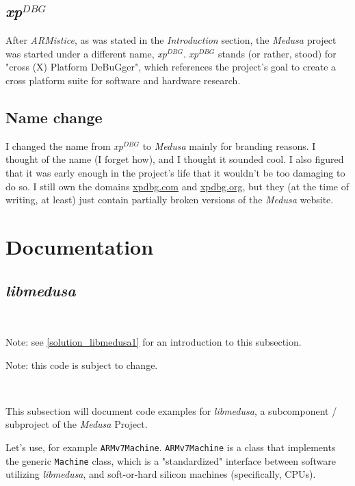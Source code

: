 \documentclass{article}
\newcommand{\xpDBG}{\textit{xp$^{DBG}$}\xspace}
\newcommand{\Medusa}{\textit{Medusa}\xspace}
\begin{document}
	\subsection{\xpDBG}
	After \textit{ARMistice}, as was stated in the \textit{Introduction}
	section, the \textit{Medusa} project was started under a different name,
	\xpDBG. \xpDBG stands (or rather, stood) for "cross (X) Platform
	DeBuGger", which references the project's goal to create a cross platform
	suite for software and hardware research. 

	\subsection{Name change}
	I changed the name from \xpDBG to \Medusa mainly for branding reasons. I
	thought of the name (I forget how), and I thought it sounded cool. I also
	figured that it was early enough in the project's life that it wouldn't be
	too damaging to do so. I still own the domains
	\href{https://xpdbg.com}{xpdbg.com} and \href{https://xpdbg.org}{xpdbg.org},
	but they (at the time of writing, at least) just contain partially broken
	versions of the \Medusa website.

	\section{Documentation}
	\subsection{\textit{libmedusa}}
	\

	Note: see \ref{solution_libmedusa1} for an introduction to this subsection.

	Note: this code is subject to change.

	\

	This subsection will document code examples for \textit{libmedusa}, a
	subcomponent / subproject of the \Medusa Project.

	Let's use, for example \texttt{ARMv7Machine}. \texttt{ARMv7Machine} is a
	class that implements the generic \texttt{Machine} class, which is a
	"standardized" interface between software utilizing \textit{libmedusa}, and
	soft-or-hard silicon machines (specifically, CPUs).
\end{document}
